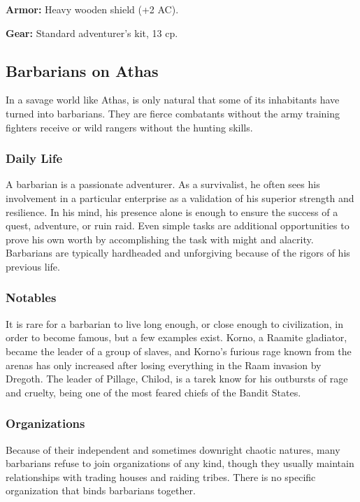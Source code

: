 \textbf{Armor:} Heavy wooden shield (+2 AC).

\textbf{Gear:} Standard adventurer's kit, 13 cp.

\subsection{Barbarians on Athas}

In a savage world like Athas, is only natural that some of its inhabitants have turned into barbarians. They are fierce combatants without the army training fighters receive or wild rangers without the hunting skills.

\subsubsection{Daily Life}

A barbarian is a passionate adventurer. As a survivalist, he often sees his involvement in a particular enterprise as a validation of his superior strength and resilience. In his mind, his presence alone is enough to ensure the success of a quest, adventure, or ruin raid. Even simple tasks are additional opportunities to prove his own worth by accomplishing the task with might and alacrity. Barbarians are typically hardheaded and unforgiving because of the rigors of his previous life.

\subsubsection{Notables}

It is rare for a barbarian to live long enough, or close enough to civilization, in order to become famous, but a few examples exist. Korno, a Raamite gladiator, became the leader of a group of slaves, and Korno's furious rage known from the arenas has only increased after losing everything in the Raam invasion by Dregoth. The leader of Pillage, Chilod, is a tarek know for his outbursts of rage and cruelty, being one of the most feared chiefs of the Bandit States.

\subsubsection{Organizations}

Because of their independent and sometimes downright chaotic natures, many barbarians refuse to join organizations of any kind, though they usually maintain relationships with trading houses and raiding tribes. There is no specific organization that binds barbarians together.

